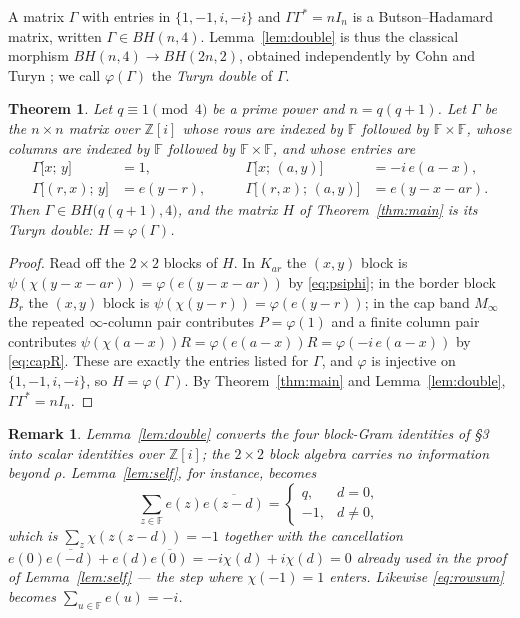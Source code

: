 \documentclass[11pt]{article}
\newtheorem{theorem}{Theorem}
\newtheorem{remark}{Remark}
\newcommand{\F}{\mathbb F}
\newcommand{\Z}{\mathbb Z}
\begin{document}
A matrix \(\Gamma\) with entries in \(\{1,-1,i,-i\}\) and
\(\Gamma\Gamma^{*}=nI_n\) is a Butson--Hadamard matrix, written
\(\Gamma\in BH(n,4)\).  Lemma~\ref{lem:double} is thus the classical
morphism \(BH(n,4)\to BH(2n,2)\), obtained independently by Cohn
\cite{Cohn1965} and Turyn \cite{Turyn1970}; we call \(\varphi(\Gamma)\) the
\emph{Turyn double} of \(\Gamma\).

\begin{theorem}\label{thm:complex}
Let \(q\equiv1\pmod4\) be a prime power and \(n=q(q+1)\).  Let \(\Gamma\) be
the \(n\times n\) matrix over \(\Z[i]\) whose rows are indexed by \(\F\)
followed by \(\F\times\F\), whose columns are indexed by \(\F\) followed by
\(\F\times\F\), and whose entries are
\[
\begin{aligned}
        \Gamma\bigl[x;\,y\bigr]&=1, &\qquad
        \Gamma\bigl[x;\,(a,y)\bigr]&=-i\,e(a-x),\\[2pt]
        \Gamma\bigl[(r,x);\,y\bigr]&=e(y-r), &\qquad
        \Gamma\bigl[(r,x);\,(a,y)\bigr]&=e(y-x-ar).
\end{aligned}
\]
Then \(\Gamma\in BH\bigl(q(q+1),4\bigr)\), and the matrix \(H\) of
Theorem~\ref{thm:main} is its Turyn double: \(H=\varphi(\Gamma)\).
\end{theorem}

\begin{proof}
Read off the \(2\times2\) blocks of \(H\).  In \(K_{ar}\) the \((x,y)\) block
is \(\psi(\chi(y-x-ar))=\varphi(e(y-x-ar))\) by \eqref{eq:psiphi}; in the
border block \(B_r\) the \((x,y)\) block is
\(\psi(\chi(y-r))=\varphi(e(y-r))\); in the cap band \(M_\infty\) the
repeated \(\infty\)-column pair contributes \(P=\varphi(1)\) and a finite
column pair contributes
\(\psi(\chi(a-x))R=\varphi(e(a-x))R=\varphi(-i\,e(a-x))\) by
\eqref{eq:capR}.  These are exactly the entries listed for \(\Gamma\), and
\(\varphi\) is injective on \(\{1,-1,i,-i\}\), so \(H=\varphi(\Gamma)\).
By Theorem~\ref{thm:main} and Lemma~\ref{lem:double},
\(\Gamma\Gamma^{*}=nI_n\).
\end{proof}

\begin{remark}\label{rem:scalar}
Lemma~\ref{lem:double} converts the four block-Gram identities of \S3 into
scalar identities over \(\Z[i]\); the \(2\times2\) block algebra carries no
information beyond \(\rho\).  Lemma~\ref{lem:self}, for instance, becomes
\[
        \sum_{z\in\F}e(z)\overline{e(z-d)}=
        \begin{cases} q,& d=0,\\ -1,& d\neq0,\end{cases}
\]
which is \(\sum_{z}\chi(z(z-d))=-1\) together with the cancellation
\(e(0)\overline{e(-d)}+e(d)\overline{e(0)}=-i\chi(d)+i\chi(d)=0\) already
used in the proof of Lemma~\ref{lem:self} --- the step where
\(\chi(-1)=1\) enters.  Likewise \eqref{eq:rowsum} becomes
\(\sum_{u\in\F}e(u)=-i\).
\end{remark}
\end{document}
